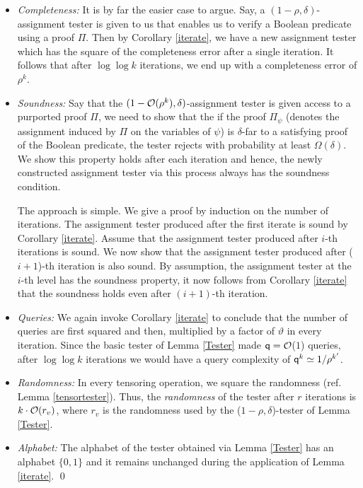 \begin{itemize}
\item {\em Completeness:} It is by far the easier case to argue. Say,
  a $(1 - \rho, \delta)$-assignment tester is given to us that enables
  us to verify a Boolean predicate using a proof $\Pi$. Then by
  Corollary \ref{iterate}, we have a new assignment tester which has
  the square of the completeness error after a single iteration. It
  follows that after $\log \log k$ iterations, we end up with a
  completeness error of ${\rho^k}$.

\item {\em Soundness:} Say that the $(1 - {\cal
    O}(\rho^k),\delta)$-assignment tester is given access to a
  purported proof $\Pi$, we need to show that the if the proof
  $\Pi_{\psi}$ (denotes the assignment induced by $\Pi$ on the
  variables of $\psi$) is $\delta$-far to a satisfying proof of the
  Boolean predicate, the tester rejects with probability at least
  $\Omega(\delta)$. We show this property holds after each iteration
  and hence, the newly constructed assignment tester via this process
  always has the soundness condition.

  The approach is simple. We give a proof by induction on the number
  of iterations. The assignment tester produced after the first
  iterate is sound by Corollary \ref{iterate}. Assume that the
  assignment tester produced after $i$-th iterations is sound. We now
  show that the assignment tester produced after ($i+1$)-th iteration
  is also sound. By assumption, the assignment tester at the $i$-th
  level has the soundness property, it now follows from Corollary
  \ref{iterate} that the soundness holds even after $(i+1)$-th
  iteration.

\item {\em Queries:} We again invoke Corollary \ref{iterate} to
  conclude that the number of queries are first squared and then,
  multiplied by a factor of $\vartheta$ in every iteration. Since the
  basic tester of Lemma \ref{Tester} made ${\sf q} = {\cal O}$($1$)
  queries, after $\log \log k$ iterations we would have a query
  complexity of ${\sf q}^{k} \simeq 1/\rho^{k'}$.

\item {\em Randomness:} In every tensoring operation, we square the
  randomness (ref. Lemma \ref{tensortester}). Thus, the {\em
    randomness} of the tester after $r$ iterations is $k \cdot {\cal
    O}(r_v)$, where $r_v$ is the randomness used by the ($1 - \rho,
  \delta$)-tester of Lemma \ref{Tester}.

\item {\em Alphabet:} The alphabet of the tester obtained via Lemma
  \ref{Tester} has an alphabet $\{ 0,1\}$ and it remains unchanged
  during the application of Lemma \ref{iterate}. \qed
\end{itemize}




